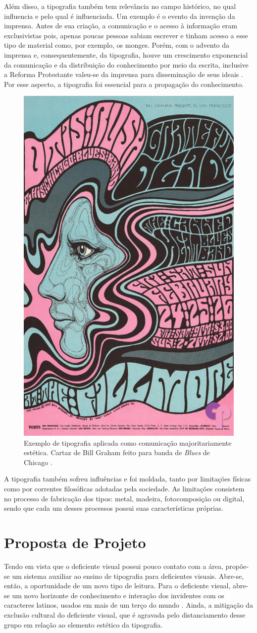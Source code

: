 Além disso, a tipografia também tem relevância no campo histórico, no qual influencia e pelo qual é influenciada. Um exemplo é o evento da invenção da imprensa. Antes de sua criação, a comunicação e o acesso à informação eram exclusivistas pois, apenas poucas pessoas sabiam escrever e tinham acesso a esse tipo de material como, por exemplo, os monges. Porém, com o advento da imprensa e, consequentemente, da tipografia, houve um crescimento exponencial da comunicação e da distribuição do conhecimento por meio da escrita, inclusive a Reforma Protestante valeu-se da imprensa para disseminação de seus ideais . Por esse aspecto, a tipografia foi essencial para a propagação do conhecimento.

\begin{figure}[H]
 \centering
  \includegraphics[width=0.4\linewidth]{figuras/posterTipo.pdf}
  \caption{Exemplo de tipografia aplicada como comunicação majoritariamente estética. Cartaz de Bill Graham feito para banda de \textit{Blues} de Chicago .}
  \label{fig:posterTipo}
\end{figure}


A tipografia também sofreu influências e foi moldada, tanto por limitações físicas como por correntes filosóficas adotadas pela sociedade. As limitações consistem no processo de fabricação dos tipos: metal, madeira, fotocomposição ou digital, sendo que cada um desses processos possui suas características próprias.


\section{Proposta de Projeto}

Tendo em vista que o deficiente visual possui pouco contato com a área, propõe-se um sistema auxiliar ao ensino de tipografia para deficientes visuais. Abre-se, então, a oportunidade de um novo tipo de leitura. Para o deficiente visual, abre-se um novo horizonte de conhecimento e interação dos invidentes com os caracteres latinos, usados em mais de um terço do mundo . Ainda, a mitigação da exclusão cultural do deficiente visual, que é agravada pelo distanciamento desse grupo em relação ao elemento estético da tipografia.

